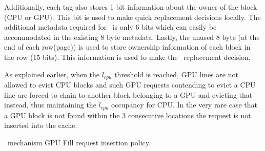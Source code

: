 Additionally, each tag also stores 1 bit information about the owner of the block (CPU or GPU). This bit is used to make quick replacement decisions locally. The additional metadata required for \chaining\ is only 6 bits which can easily be accommodated in the existing 8 byte metadata. Lastly, the unused 8 byte (at the end of each row(page)) is used to store ownership information of each block in the row (15 bits). This information is used to make the \chaining\ replacement decision.


\par As explained earlier, when the \textit{$l_{cpu}$} threshold is reached, GPU lines are not allowed to evict CPU blocks and such GPU requests contending to evict a CPU line are forced to chain to another block belonging to a GPU and evicting that instead, thus maintaining the \textit{$l_{cpu}$} occupancy for CPU. In the very rare case that a GPU block is not found within the 3 consecutive locations the request is not inserted into the cache.

\begin{table}[htb]
	\centering
	
	\caption{\chaining\ mechanism GPU Fill request insertion policy. }
	\label{chaining-replacement}
\end{table}

